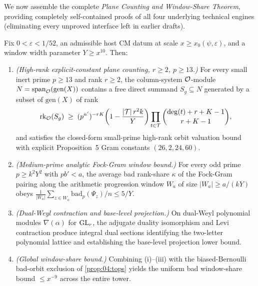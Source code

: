 We now assemble the complete \emph{Plane Counting and Window-Share Theorem}, providing completely self-contained proofs of all four underlying technical engines (eliminating every unproved interface left in earlier drafts).


\begin{theorem}
\label{thm:09:window-share}
Fix $0 < \varepsilon < 1/52$, an admissible host CM datum at scale $x \ge x_0(\psi, \varepsilon)$, and a window width parameter $Y \ge x^{10}$. Then:
\begin{enumerate}[label=\textup{(\roman*)}]
\item \emph{(High-rank explicit-constant plane counting, $r \ge 2$, $p \ge 13$.)} For every small inert prime $p \ge 13$ and rank $r \ge 2$, the column-system $\mathcal{O}$-module $N = \operatorname{span}_{\mathcal{O}}(\mathrm{gen}(X))$ contains a free direct summand $S_g \subseteq N$ generated by a subset of $\mathrm{gen}(X)$ of rank
  \begin{equation}
  \label{eq:09:plane-rank}
    \operatorname{rk}_{\mathcal{O}}(S_g) \;\ge\; (p^{n'})^{-rK}\!\left(1 - \frac{|\mathcal{T}|\, r^2 k}{Y}\right) \prod_{t \in \mathcal{T}} \binom{\deg(t) + r + K - 1}{r + K - 1},
  \end{equation}
  and satisfies the closed-form small-prime high-rank orbit valuation bound with explicit Proposition~5 Gram constants $(26, 2, 24, 60)$.
\item \emph{(Medium-prime analytic Fock-Gram window bound.)} For every odd prime $p \ge k^2 Y^2$ with $p b' < a$, the average bad rank-share $\kappa$ of the Fock-Gram pairing along the arithmetic progression window $W_a$ of size $|W_a| \ge a/(kY)$ obeys $\frac{1}{|W_a|}\sum_{z \in W_a} \mathrm{bad}_p(\Psi_z) / n \le 5/Y$.
\item \emph{(Dual-Weyl contraction and base-level projection.)} On dual-Weyl polynomial modules $\nabla(\alpha)$ for $\mathrm{GL}_r$, the adjugate duality isomorphism and Levi contraction produce integral dual sections identifying the two-letter polynomial lattice and establishing the base-level projection lower bound.
\item \emph{(Global window-share bound.)} Combining \textup{(i)--(iii)} with the biased-Bernoulli bad-orbit exclusion of \cref{prop:04:tops} yields the uniform bad window-share bound $\le x^{-9}$ across the entire tower.
\end{enumerate}
\end{theorem}

